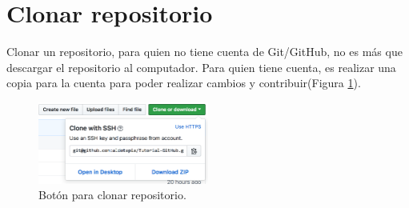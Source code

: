 \documentclass[10pt]{article}
\begin{document}
\section{Clonar repositorio}

Clonar un repositorio, para quien no tiene cuenta de Git/GitHub, no es más que descargar el repositorio al computador. Para quien tiene cuenta, es realizar una copia para la cuenta para poder realizar cambios y contribuir(Figura \ref{clonar}). \\

\begin{figure}[!h]
  \centering
    \includegraphics[width=0.5\textwidth]{Figuras/clonar.png}
  \caption{Botón para clonar repositorio.}
  \label{clonar}
\end{figure}
\end{document}
